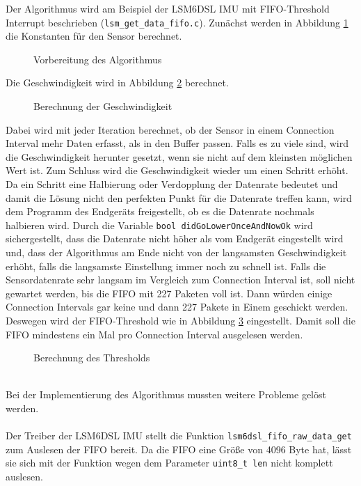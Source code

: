 Der Algorithmus wird am Beispiel der LSM6DSL IMU mit FIFO-Threshold Interrupt beschrieben (\texttt{lsm\_get\_data\_fifo.c}).
Zunächst werden in Abbildung \ref{lst:algoPre} die Konstanten für den Sensor berechnet.
\begin{figure}[hbtp]
	
	\caption{Vorbereitung des Algorithmus}
	\label{lst:algoPre}
\end{figure}
Die Geschwindigkeit wird in Abbildung \ref{lst:algo} berechnet.
\begin{figure}[hbtp]
	
	\caption{Berechnung der Geschwindigkeit}
	\label{lst:algo}
\end{figure}
Dabei wird mit jeder Iteration berechnet, ob der Sensor in einem Connection Interval mehr Daten erfasst, als in den Buffer passen.
Falls es zu viele sind, wird die Geschwindigkeit herunter gesetzt, wenn sie nicht auf dem kleinsten möglichen Wert ist.
Zum Schluss wird die Geschwindigkeit wieder um einen Schritt erhöht.
Da ein Schritt eine Halbierung oder Verdopplung der Datenrate bedeutet und damit die Lösung nicht den perfekten Punkt für die Datenrate treffen kann, wird dem Programm des Endgeräts freigestellt, ob es die Datenrate nochmals halbieren wird.
Durch die Variable \texttt{bool didGoLowerOnceAndNowOk} wird sichergestellt, dass die Datenrate nicht höher als vom Endgerät eingestellt wird und, dass der Algorithmus am Ende nicht von der langsamsten Geschwindigkeit erhöht, falls die langsamste Einstellung immer noch zu schnell ist.
Falls die Sensordatenrate sehr langsam im Vergleich zum Connection Interval ist, soll nicht gewartet werden, bis die FIFO mit 227 Paketen voll ist.
Dann würden einige Connection Intervals gar keine und dann 227 Pakete in Einem geschickt werden.
Deswegen wird der FIFO-Threshold wie in Abbildung \ref{lst:algoPost} eingestellt.
Damit soll die FIFO mindestens ein Mal pro Connection Interval ausgelesen werden.
\begin{figure}[hbtp]
	
	\caption{Berechnung des Thresholds}
	\label{lst:algoPost}
\end{figure}\\
Bei der Implementierung des Algorithmus mussten weitere Probleme gelöst werden.\\\\
Der Treiber der LSM6DSL IMU stellt die Funktion \texttt{lsm6dsl\_fifo\_raw\_data\_get} zum Auslesen der FIFO bereit.
Da die FIFO eine Größe von 4096 Byte hat, lässt sie sich mit der Funktion wegen dem Parameter \texttt{uint8\_t len} nicht komplett auslesen.
